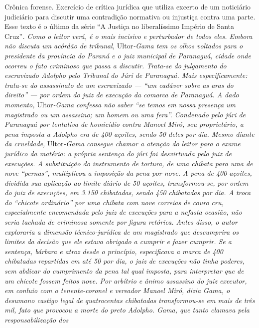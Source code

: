 \begin{didascalia}
Crônica forense. Exercício de crítica jurídica que utiliza excerto de um
noticiário judiciário para discutir uma contradição normativa ou
injustiça contra uma parte. Esse texto é o último da série ``A Justiça
no liberalíssimo Império de Santa Cruz''\emph{. Como o leitor verá, é o
mais incisivo e perturbador de todos eles. Embora não discuta um acórdão
de tribunal,} Ultor\emph{-Gama tem os olhos voltados para o presidente
da província do Paraná e o juiz municipal de Paranaguá, cidade onde
ocorreu o fato criminoso que passa a discutir. Trata-se do julgamento do
escravizado Adolpho pelo Tribunal do Júri de Paranaguá. Mais
especificamente: trata-se do assassinato de um escravizado --- ``um
cadáver sobre as aras do direito'' --- por ordem do juiz de execução da
comarca de Paranaguá. A dado momento,} Ultor\emph{-Gama confessa não
saber ``se temos em nossa presença um magistrado ou um assassino; um
homem ou uma fera''. Condenado pelo júri de Paranaguá por tentativa de
homicídio contra Manoel Miró, seu proprietário, a pena imposta a Adolpho
era de 400 açoites, sendo 50 deles por dia. Mesmo diante da crueldade,}
Ultor\emph{-Gama consegue chamar a atenção do leitor para o exame
jurídico da matéria: a própria sentença do júri foi desvirtuada pelo
juiz de execuções. A substituição do instrumento de tortura, de uma
chibata para uma de nove ``pernas'', multiplicou a imposição da pena por
nove. A pena de 400 açoites, dividida sua aplicação ao limite diário de
50 açoites, transformou-se, por ordem do juiz de execuções, em 3.150
chibatadas, sendo 450 chibatadas por dia. A troca do ``chicote ordinário''
por uma chibata com nove correias de couro cru, especialmente
encomendada pelo juiz de execuções para a nefasta ocasião, não seria
tachada de criminosa somente por figura retórica. Antes disso, o autor
exploraria a dimensão técnico-jurídica de um magistrado que descumprira
os limites da decisão que ele estava obrigado a cumprir e fazer cumprir.
Se a sentença, bárbara e atroz desde o princípio, especificava a marca
de 400 chibatadas repartidas em até 50 por dia, o juiz de execuções não
tinha poderes, sem abdicar do cumprimento da pena tal qual imposta, para
interpretar que de um chicote fossem feitos nove. Por arbítrio e ânimo
assassino do juiz executor, em conluio com o tenente-coronel e vereador
Manoel Miró, dizia Gama, o desumano castigo legal de quatrocentas
chibatadas transformou-se em mais de três mil, fato que provocou a morte
do preto Adolpho. Gama, que tanto clamava pela responsabilização dos
}
\end{didascalia}

